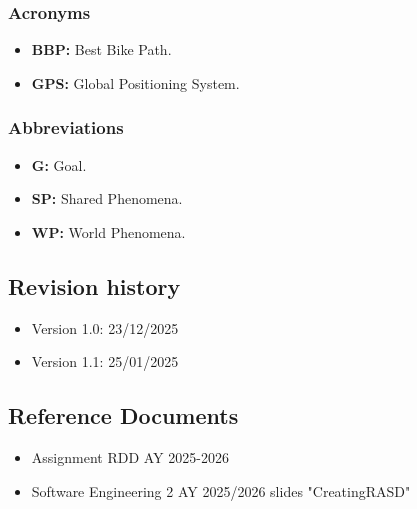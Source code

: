\subsubsection{Acronyms}
\begin{itemize}
    \item \textbf{BBP:} Best Bike Path.
    \item \textbf{GPS:} Global Positioning System.
\end{itemize}

\subsubsection{Abbreviations}
\begin{itemize}
    \item \textbf{G:} Goal.
    \item \textbf{SP:} Shared Phenomena.
    \item \textbf{WP: } World Phenomena.
\end{itemize}

\subsection{Revision history}
\begin{itemize}
    \item Version 1.0: 23/12/2025
    \item Version 1.1: 25/01/2025
    
\end{itemize}
\subsection{Reference Documents}
\begin{itemize}
    \item Assignment RDD AY 2025-2026
    \item Software Engineering 2 AY 2025/2026 slides "CreatingRASD"
\end{itemize}
